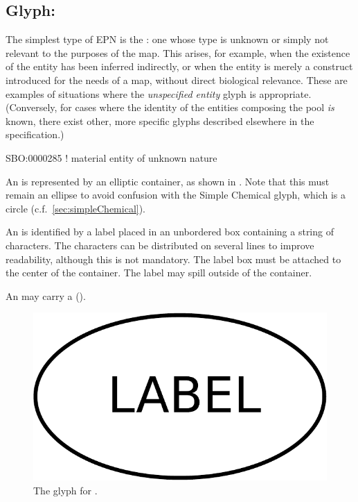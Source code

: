 
\subsection{Glyph: }
\label{sec:unspecifiedEntity}

The simplest type of EPN is the : one whose type is unknown or simply not relevant to the purposes of the map.  This arises, for example, when the existence of the entity has been inferred indirectly, or when the entity is merely a construct introduced for the needs of a map, without direct biological relevance.  These are examples of situations where the \emph{unspecified entity} glyph is appropriate.  (Conversely, for cases where the identity of the entities composing the pool \emph{is} known, there exist other, more specific glyphs described elsewhere in the specification.)

\begin{glyphDescription}

\glyphSboTerm SBO:0000285 ! material entity of unknown nature 

\glyphContainer An  is represented by an
elliptic container, as shown in .  Note that this
must remain an ellipse to avoid confusion with the Simple Chemical
glyph, which is a circle (c.f.\, \ref{sec:simpleChemical}).

\glyphLabel An  is identified by a label
placed in an unbordered box containing a string of characters.  The
characters can be distributed on several lines to improve readability,
although this is not mandatory.  The label box must be attached to the
center of the container.  The label may spill outside of the
container.

\glyphAux An  may carry a  ().

\end{glyphDescription}

\begin{figure}[H]
  \centering
  \includegraphics[scale = 0.3]{images/unspecified}
  \caption{The \PD glyph for .}
  \label{fig:unspecified}
\end{figure}

